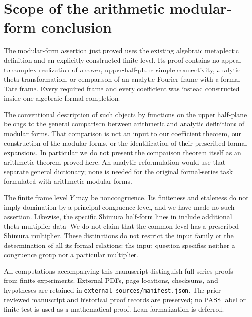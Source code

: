 \documentclass[11pt]{article}
\theoremstyle{remark}\newtheorem{remark}[theorem]{Remark}
\begin{document}
\section{Scope of the arithmetic modular-form conclusion}\label{scope}
The modular-form assertion just proved uses the existing algebraic
metaplectic definition and an explicitly constructed finite level.
Its proof contains no appeal to complex realization of a cover,
upper-half-plane simple connectivity, analytic theta transformation,
or comparison of an analytic Fourier frame with a formal Tate frame.
Every required frame and every coefficient was instead constructed
inside one algebraic formal completion.

The conventional description of such objects by functions on the
upper half-plane belongs to the general comparison between arithmetic
and analytic definitions of modular forms. That comparison is not an
input to our coefficient theorem, our construction of the modular
forms, or the identification of their prescribed formal expansions.
In particular we do not present the comparison theorem itself as an
arithmetic theorem proved here. An analytic reformulation would use
that separate general dictionary; none is needed for the original
formal-series task formulated with arithmetic modular forms.

The finite frame level $Y$ may be noncongruence. Its finiteness and
etaleness do not imply domination by a principal congruence level,
and we have made no such assertion. Likewise, the specific Shimura
half-form lines in \cite[Definitions 3.4.1 and 3.4.4]{candelori}
include additional theta-multiplier data. We do not claim that the
common level has a prescribed Shimura multiplier. These distinctions
do not restrict the input family or the determination of all its
formal relations: the input question specifies neither a congruence
group nor a particular multiplier.

All computations accompanying this manuscript distinguish full-series
proofs from finite experiments. External PDFs, page locations, checksums,
and hypotheses are retained in \texttt{external\_sources/manifest.json}.
The prior reviewed manuscript and historical proof records are preserved;
no PASS label or finite test is used as a mathematical proof.
Lean formalization is deferred.
\end{document}
